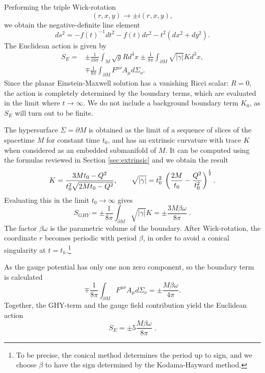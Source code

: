 Performing the triple Wick-rotation
\begin{equation*}
    (r,x,y) \rightarrow \pm i ({r}, {x},{y}),
\end{equation*}
we obtain the negative-definite line element
\begin{equation}
    ds^2 = -f(t)^{-1} dt^2 - f(t) d{r}^2 - t^2 (d{x}^2 + d{y}^2).
\end{equation}
The Euclidean action is given by
\begin{equation*}
\begin{aligned}
        S_E = &\pm \frac{1}{16 \pi} \int_{M} \sqrt{g} R d^4 x \pm \frac{1}{8\pi} \int_{\partial M} \sqrt{|\gamma|}Kd^3x , \\
        &\mp \frac{1}{8\pi} \int_{\partial M} F^{\mu \nu } A_\mu d\Sigma_\nu.
\end{aligned}
\end{equation*}
Since the planar Einstein-Maxwell solution has a vanishing Ricci scalar: $R = 0$, the action is completely determined by the boundary terms, which are evaluated in the limit where $t \rightarrow \infty$. We do not include a background boundary term $K_0$, as $S_E$ will turn out to be finite. 

The hypersurface $\Sigma = \partial M$ is obtained as the limit of a sequence of slices of the spacetime $M$ for constant time $t_0$, and has an extrinsic curvature with trace $K$ when considered as an embedded submanifold of $M$. It can be computed using the formulas reviewed in Section \ref{sec:extrinsic} and we obtain the result
\begin{equation*}
    K = \frac{3Mt_0 -Q^2}{t_0^2 \sqrt{2 M t_0 - Q^2}} ,\qquad \sqrt{|\gamma|} = t_0^2 \; \left( \frac{2M}{t_0} - \frac{Q^2}{t_0^2} \right)^{\frac{1}{2}}.
\end{equation*}
Evaluating this in the limit $t_0 \rightarrow \infty$ gives
\begin{equation*}
    S_{GHY} = \pm \frac{1}{8\pi} \int_{\partial M} \sqrt{|\gamma|} K  = \pm 
    \frac{3 M \beta \omega}{8\pi} \;.
    \end{equation*}
The factor $\beta \omega$ is the parametric volume of the boundary.     
After Wick-rotation, the coordinate $r$ becomes periodic with period $\beta$, in order to avoid a conical singularity at $t=t_h$.\footnote{To be precise, the conical method determines the period up to sign, and we choose $\beta$ to have the sign determined by the Kodama-Hayward method.}     
    
As the gauge potential has only one non zero component, so the boundary term is calculated
\begin{equation*}
        \mp \frac{1}{8\pi} \int_{\partial M} F^{\mu \nu } A_\mu d\Sigma_\nu
    =  \pm \frac{M \beta \omega}{4 \pi}.
\end{equation*}
Together, the GHY-term and the gauge field contribution yield the Euclidean action
\begin{equation}
\label{eq:emeucact}
    S_E = \pm  5 \frac{M \beta  \omega}{8 \pi} \;.
\end{equation}

